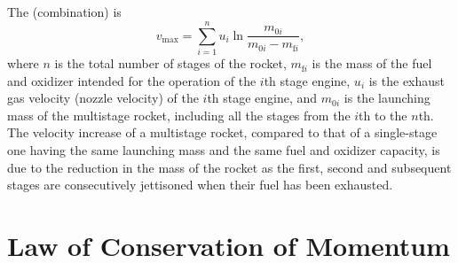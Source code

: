 \subsection{}\label{2.6.5} The  (combination)  is
\begin{equation*}%
v_{\textrm{max}}= \sum_{i=1}^{n} u_{i} \ln  \frac{m_{0i}}{m_{0i}-m_{\textrm{f}i}},
\end{equation*}
where $n$ is the total number of stages of the rocket, $m_{\textrm{f}i}$ is the mass of the fuel and oxidizer intended for the operation of the $i$th stage engine, $ u_{i}$ is the exhaust gas velocity (nozzle velocity) of the $i$th stage engine, and $m_{0i}$ is the launching mass of the multistage rocket, including all the stages from the $i$th to the $n$th. The velocity increase of a multistage rocket, compared to that of a single-stage one having the same launching mass and the same fuel and oxidizer capacity, is due to the reduction in the mass of the rocket as the first, second and subsequent stages are consecutively jettisoned when their fuel has been ex­hausted.
	
\section{Law of Conservation of Momentum}
\label{sec-2.7}

